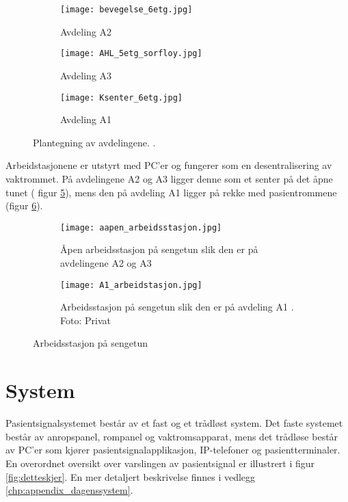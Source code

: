 \begin{figure}[H]
        \centering
        \begin{subfigure}[b]{1.0\textwidth}
        		\centering
				\texttt{[image: bevegelse\_6etg.jpg]}
				\caption{Avdeling A2}
				\label{fig:Bevegelse}
        \end{subfigure}
        
        \begin{subfigure}[b]{1.0\textwidth}
        		\centering
				\texttt{[image: AHL\_5etg\_sorfloy.jpg]}
				\caption{Avdeling A3}
				\label{fig:AHL}
        \end{subfigure}
        
        \begin{subfigure}[b]{1.0\textwidth}
        		\centering
				\texttt{[image: Ksenter\_6etg.jpg]}
				\caption{Avdeling A1}
				\label{fig:Ksenter}		
        \end{subfigure}
        \caption{Plantegning av avdelingene. \citep{sykehuskart}.}
        \label{Plantegninger}
\end{figure}

\noindent
Arbeidstasjonene er utstyrt med PC'er og fungerer som en desentralisering av vaktrommet. På avdelingene A2 og A3 ligger denne som et senter på det åpne tunet ( figur \ref{fig:aapen_arbeidsstasjon}), mens den på avdeling A1 ligger på rekke med pasientrommene (figur \ref{fig:A1_arbeidsstasjon}).

\begin{figure}[H]
\centering
	\begin{subfigure}[b]{1.0\textwidth}
		\centering
		\texttt{[image: aapen\_arbeidsstasjon.jpg]}
		\caption{Åpen arbeidsstasjon på sengetun slik den er på avdelingene A2 og A3 			\citep{sykehuskart}}
		\label{fig:aapen_arbeidsstasjon}
	\end{subfigure}
	
	\begin{subfigure}[b]{1.0\textwidth}
		\centering
		\texttt{[image: A1\_arbeidstasjon.jpg]}
		\caption{Arbeidsstasjon på sengetun slik den er på avdeling A1 							\citep{sykehuskart}. Foto: Privat}
		\label{fig:A1_arbeidsstasjon}
	\end{subfigure}
\caption{Arbeidsstasjon på sengetun}
\label{fig:arbeidsstasjon}
\end{figure}

\section{System}
Pasientsignalsystemet består av et fast og et trådløst system. Det faste systemet består av anropspanel, rompanel og vaktromsapparat, mens det trådløse består av PC'er som kjører pasientsignalapplikasjon, IP-telefoner og pasientterminaler. En overordnet oversikt over varslingen av pasientsignal er illustrert i figur \ref{fig:detteskjer}. En mer detaljert beskrivelse finnes i vedlegg \ref{chp:appendix_dagenssystem}.

